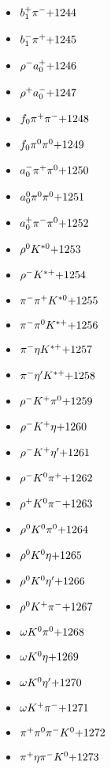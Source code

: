 \begin{multicols}{3}
\begin{itemize}
 \item $ b_{1}^{+} \pi^{-} \hfill{+1244}$
 \item $ b_{1}^{-} \pi^{+} \hfill{+1245}$
 \item $ \rho^{-} a_{0}^{+} \hfill{+1246}$
 \item $ \rho^{+} a_{0}^{-} \hfill{+1247}$
 \item $ f_{0} \pi^{+} \pi^{-} \hfill{+1248}$
 \item $ f_{0} \pi^{0} \pi^{0} \hfill{+1249}$
 \item $ a_{0}^{-} \pi^{+} \pi^{0} \hfill{+1250}$
 \item $ a_{0}^{0} \pi^{0} \pi^{0} \hfill{+1251}$
 \item $ a_{0}^{+} \pi^{-} \pi^{0} \hfill{+1252}$
 \item $ \rho^{0} K^{*0} \hfill{+1253}$
 \item $ \rho^{-} K^{*+} \hfill{+1254}$
 \item $ \pi^{-} \pi^{+} K^{*0} \hfill{+1255}$
 \item $ \pi^{-} \pi^{0} K^{*+} \hfill{+1256}$
 \item $ \pi^{-} \eta K^{*+} \hfill{+1257}$
 \item $ \pi^{-} {\eta^{\prime}} K^{*+} \hfill{+1258}$
 \item $ \rho^{-} K^{+} \pi^{0} \hfill{+1259}$
 \item $ \rho^{-} K^{+} \eta \hfill{+1260}$
 \item $ \rho^{-} K^{+} {\eta^{\prime}} \hfill{+1261}$
 \item $ \rho^{-} K^{0} \pi^{+} \hfill{+1262}$
 \item $ \rho^{+} K^{0} \pi^{-} \hfill{+1263}$
 \item $ \rho^{0} K^{0} \pi^{0} \hfill{+1264}$
 \item $ \rho^{0} K^{0} \eta \hfill{+1265}$
 \item $ \rho^{0} K^{0} {\eta^{\prime}} \hfill{+1266}$
 \item $ \rho^{0} K^{+} \pi^{-} \hfill{+1267}$
 \item $ \omega K^{0} \pi^{0} \hfill{+1268}$
 \item $ \omega K^{0} \eta \hfill{+1269}$
 \item $ \omega K^{0} {\eta^{\prime}} \hfill{+1270}$
 \item $ \omega K^{+} \pi^{-} \hfill{+1271}$
 \item $ \pi^{+} \pi^{0} \pi^{-} K^{0} \hfill{+1272}$
 \item $ \pi^{+} \eta \pi^{-} K^{0} \hfill{+1273}$

\end{itemize}
\end{multicols}
